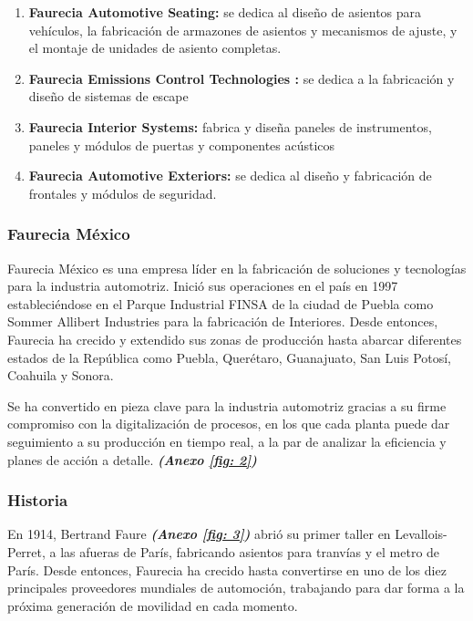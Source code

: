 \documentclass[letterpaper,12pt]{article}
\begin{document}
\begin{sloppypar}
\begin{enumerate}
    \item \textbf{Faurecia Automotive Seating:} se dedica al diseño de asientos para vehículos, la fabricación de armazones de asientos y mecanismos de ajuste, y el montaje de unidades de asiento completas. 
    \item \textbf{Faurecia Emissions Control Technologies :} se dedica a la fabricación y diseño de sistemas de escape
    \item \textbf{Faurecia Interior Systems:} fabrica y diseña paneles de instrumentos, paneles y módulos de puertas y componentes acústicos
    \item \textbf{Faurecia Automotive Exteriors: }se dedica al diseño y fabricación de frontales y módulos de seguridad.
\end{enumerate}
\newpage
\subsubsection{Faurecia México}
Faurecia México es una empresa líder en la fabricación de soluciones y tecnologías para la industria automotriz. Inició sus operaciones en el país en 1997 estableciéndose en el Parque Industrial FINSA de la ciudad de Puebla como Sommer Allibert Industries para la fabricación de Interiores. Desde entonces, Faurecia ha crecido y extendido sus zonas de producción hasta abarcar diferentes estados de la República como Puebla, Querétaro, Guanajuato, San Luis Potosí, Coahuila y Sonora.

Se ha convertido en pieza clave para la industria automotriz gracias a su firme compromiso con la digitalización de procesos, en los que cada planta puede dar seguimiento a su producción en tiempo real, a la par de analizar la eficiencia y planes de acción a detalle. \textbf{\textit{(Anexo \ref{fig: 2})}}

\subsubsection{Historia}
En 1914, Bertrand Faure \textbf{\textit{(Anexo \ref{fig: 3})}} abrió su primer taller en Levallois-Perret, a las afueras de París, fabricando asientos para tranvías y el metro de París. Desde entonces, Faurecia ha crecido hasta convertirse en uno de los diez principales proveedores mundiales de automoción, trabajando para dar forma a la próxima generación de movilidad en cada momento.


\end{sloppypar}
\end{document}
